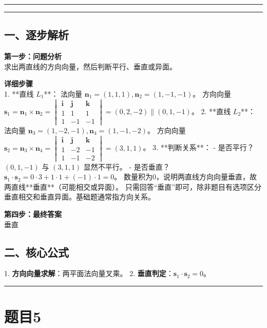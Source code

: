 \documentclass[12pt, a4paper]{ctexart}
\newcommand{\TopSeparator}{
    \par\noindent\rule{\textwidth}{1.5pt}\vspace{0.5em} %
}
\newcommand{\AnalysisSeparator}{
    \par\noindent\rule{\textwidth}{0.5pt}\vspace{0.2em}\hrule\vspace{0.5em} %
}
\newenvironment{RedAnalysis}{
    \par
    \color{red} %
}{
    \par
    \color{black} %
}
\begin{document}
\AnalysisSeparator

\begin{RedAnalysis}

\subsection*{一、逐步解析}

\textbf{第一步：问题分析} \\
求出两直线的方向向量，然后判断平行、垂直或异面。

\textbf{详细步骤} \\
1. **直线 $L_1$**：
   法向量 $\mathbf{n}_1=(1,1,1), \mathbf{n}_2=(1,-1,-1)$。
   方向向量 $\mathbf{s}_1 = \mathbf{n}_1 \times \mathbf{n}_2 = \begin{vmatrix} \mathbf{i} & \mathbf{j} & \mathbf{k} \\ 1 & 1 & 1 \\ 1 & -1 & -1 \end{vmatrix} = (0, 2, -2) \parallel (0, 1, -1)$。
2. **直线 $L_2$**：
   法向量 $\mathbf{n}_3=(1,-2,-1), \mathbf{n}_4=(1,-1,-2)$。
   方向向量 $\mathbf{s}_2 = \mathbf{n}_3 \times \mathbf{n}_4 = \begin{vmatrix} \mathbf{i} & \mathbf{j} & \mathbf{k} \\ 1 & -2 & -1 \\ 1 & -1 & -2 \end{vmatrix} = (3, 1, 1)$。
3. **判断关系**：
   - 是否平行？ $(0,1,-1)$ 与 $(3,1,1)$ 显然不平行。
   - 是否垂直？ $\mathbf{s}_1 \cdot \mathbf{s}_2 = 0 \cdot 3 + 1 \cdot 1 + (-1) \cdot 1 = 0$。
   数量积为0，说明两直线方向向量垂直，故两直线**垂直**（可能相交或异面）。
   只需回答“垂直”即可，除非题目有选项区分垂直相交和垂直异面。基础题通常指方向关系。

\textbf{第四步：最终答案} \\
垂直

\subsection*{二、核心公式}
1. \textbf{方向向量求解}：两平面法向量叉乘。
2. \textbf{垂直判定}：$\mathbf{s}_1 \cdot \mathbf{s}_2 = 0$。

\end{RedAnalysis}

\vspace{2em}

\TopSeparator
\section*{题目5}
\end{document}
